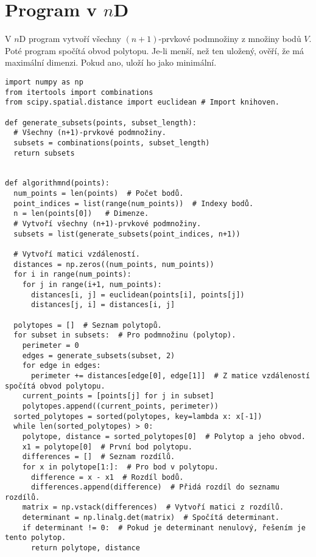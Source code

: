 \section{Program v \texorpdfstring{$n$D}{nD}}
\label{sec:program_nD}

V $n$D program vytvoří všechny $(n+1)$-prvkové podmnožiny z množiny bodů $V$. Poté program spočítá obvod polytopu. Je-li menší, než ten uložený, ověří, že má maximální dimenzi. Pokud ano, uloží ho jako minimální.

\begin{mdframed}[style=MyFrame]
\begin{lstlisting}[style=metoo]
import numpy as np
from itertools import combinations
from scipy.spatial.distance import euclidean # Import knihoven.

def generate_subsets(points, subset_length):
  # Všechny (n+1)-prvkové podmnožiny.
  subsets = combinations(points, subset_length)
  return subsets


def algorithmnd(points):
  num_points = len(points)  # Počet bodů.
  point_indices = list(range(num_points))  # Indexy bodů.
  n = len(points[0])   # Dimenze.
  # Vytvoří všechny (n+1)-prvkové podmnožiny.
  subsets = list(generate_subsets(point_indices, n+1))

  # Vytvoří matici vzdáleností.
  distances = np.zeros((num_points, num_points))
  for i in range(num_points):
    for j in range(i+1, num_points):
      distances[i, j] = euclidean(points[i], points[j])
      distances[j, i] = distances[i, j]

  polytopes = []  # Seznam polytopů.
  for subset in subsets:  # Pro podmnožinu (polytop).
    perimeter = 0
    edges = generate_subsets(subset, 2)
    for edge in edges:
      perimeter += distances[edge[0], edge[1]]  # Z matice vzdáleností spočítá obvod polytopu.
    current_points = [points[j] for j in subset]
    polytopes.append((current_points, perimeter))
  sorted_polytopes = sorted(polytopes, key=lambda x: x[-1])
  while len(sorted_polytopes) > 0:
    polytope, distance = sorted_polytopes[0]  # Polytop a jeho obvod.
    x1 = polytope[0]  # První bod polytopu.
    differences = []  # Seznam rozdílů.
    for x in polytope[1:]:  # Pro bod v polytopu.
      difference = x - x1  # Rozdíl bodů.
      differences.append(difference)  # Přidá rozdíl do seznamu rozdílů.
    matrix = np.vstack(differences)  # Vytvoří matici z rozdílů.
    determinant = np.linalg.det(matrix)  # Spočítá determinant.
    if determinant != 0:  # Pokud je determinant nenulový, řešením je tento polytop.
      return polytope, distance
\end{lstlisting}
\end{mdframed}